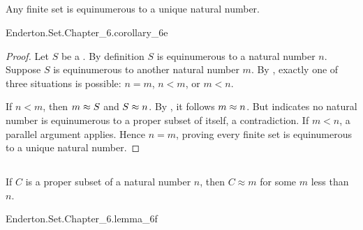 \documentclass{report}
\begin{document}
\subsection{}%

  \begin{corollary}[6E]
    Any finite set is equinumerous to a unique natural number.
  \end{corollary}

    {Enderton.Set.Chapter\_6.corollary\_6e}

  \begin{proof}
    Let $S$ be a .
    By definition $S$ is equinumerous to a natural number $n$.
    Suppose $S$ is equinumerous to another natural number $m$.
    By , exactly one of three
      situations is possible: $n = m$, $n < m$, or $m < n$.

    If $n < m$, then $m \approx S$ and $S \approx n$.
    By , it follows $m \approx n$.
    But  indicates no natural number is
      equinumerous to a proper subset of itself, a contradiction.
    If $m < n$, a parallel argument applies.
    Hence $n = m$, proving every finite set is equinumerous to a unique natural
      number.
  \end{proof}

\subsection{}%

  \begin{lemma}[6F]
    If $C$ is a proper subset of a natural number $n$, then $C \approx m$ for
      some $m$ less than $n$.
  \end{lemma}

    {Enderton.Set.Chapter\_6.lemma\_6f}
\end{document}
